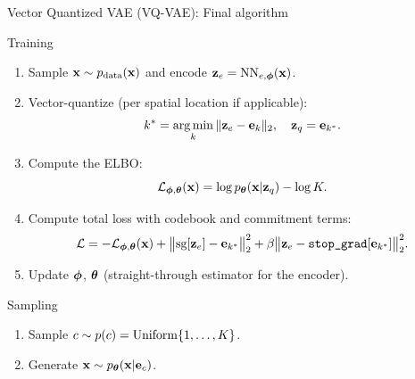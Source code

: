 \documentclass{beamer}
\renewcommand{\eqpause}{}
\begin{document}
\begin{frame}{Vector Quantized VAE (VQ-VAE): Final algorithm}
	\begin{block}{Training}
		\begin{enumerate}
			\item Sample $\mathbf{x} \sim p_{\text{data}}(\mathbf{x})$ and encode $\mathbf{z}_e = \mathrm{NN}_{e,\boldsymbol{\phi}}(\mathbf{x})$.
			\item Vector-quantize (per spatial location if applicable):
			\vspace{-0.3cm}
			\[
				k^* = \operatorname*{arg\,min}_k \|\mathbf{z}_e - \mathbf{e}_k\|_2, \quad \mathbf{z}_q = \mathbf{e}_{k^*}.
			\]
			\vspace{-0.5cm}
			\item Compute the ELBO:
			\vspace{-0.3cm}
			\[
				\mathcal{L}_{\boldsymbol{\phi}, \boldsymbol{\theta}}(\mathbf{x}) = \log p_{\boldsymbol{\theta}}(\mathbf{x} | \mathbf{z}_q) - \log K.
			\]
			\vspace{-0.5cm}
			\item Compute total loss with codebook and commitment terms:
			\vspace{-0.3cm}
			\[
				\mathcal{L} = - \mathcal{L}_{\boldsymbol{\phi}, \boldsymbol{\theta}}(\mathbf{x}) + \big\|\text{sg}[\mathbf{z}_e] - \mathbf{e}_{k^*}\big\|_2^2 + \beta \big\|\mathbf{z}_e - \texttt{stop\_grad}[\mathbf{e}_{k^*}]\big\|_2^2.
			\]
			\vspace{-0.5cm}
			\item Update $\boldsymbol{\phi}$, $\boldsymbol{\theta}$ (straight-through estimator for the encoder).
		\end{enumerate}
	\end{block}
	\eqpause
	\vspace{-0.3cm}
	\begin{block}{Sampling}
		\begin{enumerate}
			\item Sample $c \sim p(c) = \operatorname{Uniform}\{1, \dots, K\}$.
			\item Generate $\mathbf{x} \sim p_{\boldsymbol{\theta}}(\mathbf{x} | \mathbf{e}_c)$.
		\end{enumerate}
	\end{block}
\end{frame}
\end{document}
